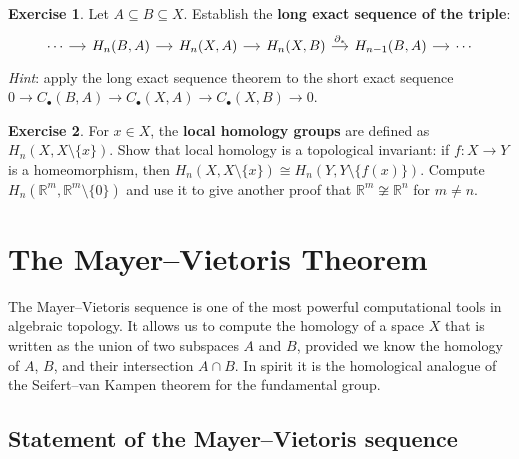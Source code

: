 \documentclass[12pt,a4paper,openany]{book}
\theoremstyle{definition}
\newtheorem{exercise}{Exercise}[chapter]
\theoremstyle{plain}
\theoremstyle{remark}
\newcommand{\R}{\mathbb{R}}
\begin{document}
\begin{exercise}\label{exo:les-triple}
Let $A\subseteq B\subseteq X$.  Establish the \textbf{long exact sequence
of the triple}:
\[
\begin{tikzcd}[column sep=1.2em]
  \cdots \ar[r]
  & H_n(B,A) \ar[r]
  & H_n(X,A) \ar[r]
  & H_n(X,B) \ar[r,"\partial_*"]
  & H_{n-1}(B,A) \ar[r]
  & \cdots
\end{tikzcd}
\]
\textit{Hint}: apply the long exact sequence theorem to the short exact
sequence $0\to C_\bullet(B,A)\to C_\bullet(X,A)\to C_\bullet(X,B)\to 0$.
\end{exercise}

\begin{exercise}\label{exo:local-homology}
For $x\in X$, the \textbf{local homology groups} are defined as
$H_n(X,X\setminus\{x\})$.  Show that local homology is a topological
invariant: if $f\colon X\to Y$ is a homeomorphism, then
$H_n(X,X\setminus\{x\})\cong H_n(Y,Y\setminus\{f(x)\})$.
Compute $H_n(\R^m,\R^m\setminus\{0\})$ and use it to give another proof
that $\R^m\not\cong\R^n$ for $m\ne n$.
\end{exercise}



\chapter{The Mayer--Vietoris Theorem}\label{ch:mayer-vietoris}

The Mayer--Vietoris sequence is one of the most powerful computational
tools in algebraic topology. It allows us to compute the homology of
a space $X$ that is written as the union of two subspaces $A$ and $B$,
provided we know the homology of $A$, $B$, and their intersection
$A\cap B$. In spirit it is the homological analogue of the
Seifert--van Kampen theorem for the fundamental group.

\section{Statement of the Mayer--Vietoris sequence}
\label{sec:mv-statement}
\end{document}
